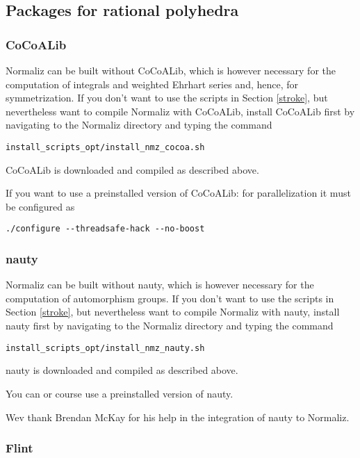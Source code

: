 \documentclass[12pt,a4paper]{scrartcl}
\theoremstyle{definition}
\begin{document}
\subsection{Packages for rational polyhedra}

\subsubsection{CoCoALib}

Normaliz can be built without CoCoALib, which is however necessary for the computation of integrals and weighted Ehrhart series and, hence,  for symmetrization. If you don't want to use the scripts in Section \ref{stroke}, but nevertheless want to compile Normaliz with CoCoALib, install  CoCoALib first by navigating to the Normaliz directory and typing the command
\begin{Verbatim}
install_scripts_opt/install_nmz_cocoa.sh
\end{Verbatim}
CoCoALib is downloaded and compiled as described above.

If you want to use a preinstalled version of CoCoALib: for parallelization  it must be configured as
\begin{Verbatim}
./configure --threadsafe-hack --no-boost 
\end{Verbatim}

\subsubsection{nauty}

Normaliz can be built without nauty, which is however necessary for the computation of automorphism groups. If you don't want to use the scripts in Section \ref{stroke}, but nevertheless want to compile Normaliz with nauty, install  nauty first by navigating to the Normaliz directory and typing the command
\begin{Verbatim}
install_scripts_opt/install_nmz_nauty.sh
\end{Verbatim}
nauty is downloaded and compiled as described above.

You can or course use a preinstalled version of nauty.

Wev thank Brendan McKay for his help in the integration of nauty to Normaliz.

\subsubsection{Flint}
\end{document}
